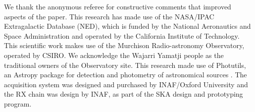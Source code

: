 \begin{acknowledgement}
We thank the anonymous referee for constructive comments that improved aspects of the paper.  This research has made use of the NASA/IPAC Extragalactic Database (NED), which is funded by the National Aeronautics and Space Administration and operated by the California Institute of Technology.
This scientific work makes use of the Murchison Radio-astronomy Observatory, operated by CSIRO. We acknowledge the Wajarri Yamatji people as the traditional owners of the Observatory site.  This research made use of Photutils, an Astropy package for
detection and photometry of astronomical sources \citep{Bradley_2019_2533376}.  The acquisition system was designed and purchased by INAF/Oxford University and the RX chain was design by INAF, as part of the SKA design and prototyping program.
\end{acknowledgement}